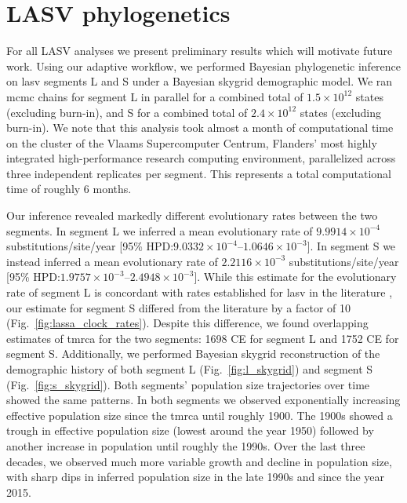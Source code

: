\section{LASV phylogenetics}

For all LASV analyses we present preliminary results which will motivate future work.
Using our adaptive workflow, we performed Bayesian phylogenetic inference on \gls{lasv} segments L and S under a Bayesian skygrid demographic model.
We ran \gls{mcmc} chains for segment L in parallel for a combined total of $1.5\times10^{12}$ states (excluding burn-in), and S for a combined total of $2.4\times10^{12}$ states (excluding burn-in).
We note that this analysis took almost a month of computational time on the cluster of the Vlaams Supercomputer Centrum, Flanders' most highly integrated high-performance research computing environment, parallelized across three independent replicates per segment.
This represents a total computational time of roughly 6 months.

Our inference revealed markedly different evolutionary rates between the two segments.
In segment L we inferred a mean evolutionary rate of $9.9914\times10^{-4}$ substitutions/site/year [95\% HPD:$9.0332\times10^{-4}$--$1.0646\times10^{-3}$].
In segment S we instead inferred a mean evolutionary rate of $2.2116\times10^{-3}$ substitutions/site/year [95\% HPD:$1.9757\times10^{-3}$--$2.4948\times10^{-3}$].
While this estimate for the evolutionary rate of segment L is concordant with rates established for \gls{lasv} in the literature \cite{andersen2015clinical, fichet2016spatial}, our estimate for segment S differed from the literature by a factor of 10 (Fig.~\ref{fig:lassa_clock_rates}).
Despite this difference, we found overlapping estimates of \gls{tmrca} for the two segments: 1698 CE for segment L and 1752 CE for segment S.
Additionally, we performed Bayesian skygrid reconstruction of the demographic history of both segment L (Fig.~\ref{fig:l_skygrid}) and segment S (Fig.~\ref{fig:s_skygrid}).
Both segments' population size trajectories over time showed the same patterns.
In both segments we observed exponentially increasing effective population size since the \gls{tmrca} until roughly 1900.
The 1900s showed a trough in effective population size (lowest around the year 1950) followed by another increase in population until roughly the 1990s.
Over the last three decades, we observed much more variable growth and decline in population size, with sharp dips in inferred population size in the late 1990s and since the year 2015.

